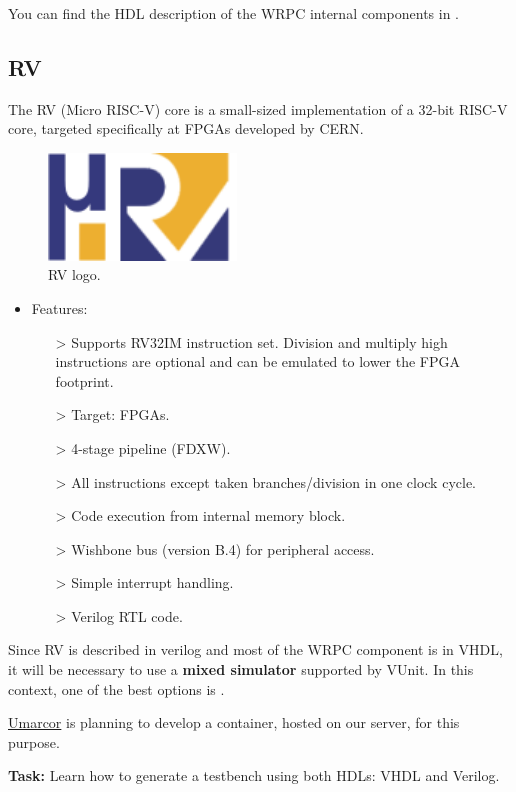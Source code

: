 \noindent You can find the HDL description of the WRPC internal components in \cite{WRPC:modules}.

\newpage

\subsection{\textmu RV}

The \textmu RV \cite{urv-core:ohwr} \cite{urv-core:wiki} \cite{Włostowski:2213516} (Micro RISC-V) core is a small-sized implementation of a 32-bit RISC-V core, targeted specifically at FPGAs developed by CERN. 

\begin{figure}[H]
    \centering
    \includegraphics[width=5cm]{figures/urv_logo.png}
    \caption{\textmu RV logo.}
    \label{fig:urv}
\end{figure}

\begin{itemize}
\item Features:
    \begin{itemize}
    \item[>] Supports RV32IM instruction set. 
Division and multiply high instructions are optional and can be emulated to lower the FPGA footprint.
    \item[>] Target: FPGAs.
    \item[>] 4-stage pipeline (FDXW).
    \item[>] All instructions except taken branches/division in one clock cycle.
    \item[>] Code execution from internal memory block.
    \item[>] Wishbone bus (version B.4) for peripheral access.
    \item[>] Simple interrupt handling.
    \item[>] Verilog RTL code.
    \end{itemize}
\end{itemize}

\noindent Since \textmu RV is described in verilog and most of the WRPC component is in VHDL, it will be necessary to use a \textbf{mixed simulator} supported by VUnit.
In this context, one of the best options is .

\vspace{5mm}

\noindent \href{https://github.com/umarcor}{Umarcor} is planning to develop a container, hosted on our server, for this purpose.

\vspace{5mm}

\noindent \textbf{Task:} Learn how to generate a testbench using both HDLs: VHDL and Verilog.


